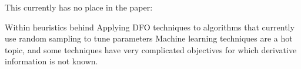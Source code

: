 \documentclass{article}
\begin{document}
%
%

This currently has no place in the paper:

Within heuristics behind
Applying DFO techniques to algorithms that currently use random sampling to tune parameters
Machine learning techniques are a hot topic, and some techniques have very complicated objectives for which derivative information is not known.

\newpage



\end{document}

